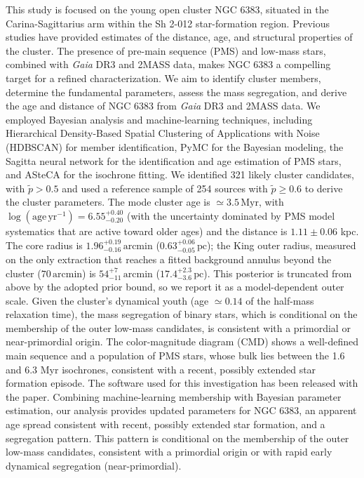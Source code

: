 \documentclass{aa}
\begin{document}
  \abstract
   {This study is focused on the young open cluster NGC 6383, situated in the Carina-Sagittarius arm within the Sh 2-012 star-formation region. Previous studies have provided estimates of the distance, age, and structural properties of the cluster. The presence of pre-main sequence (PMS) and low-mass stars, combined with \textit{Gaia} DR3 and 2MASS data, makes NGC 6383 a compelling target for a refined characterization.}
   {We aim to identify cluster members, determine the fundamental parameters, assess the mass segregation, and derive the age and distance of NGC 6383 from \textit{Gaia} DR3 and 2MASS data.}
   {We employed Bayesian analysis and machine-learning techniques, including Hierarchical Density-Based Spatial Clustering of Applications with Noise (HDBSCAN) for member identification, PyMC for the Bayesian modeling, the Sagitta neural network for the identification and age estimation of PMS stars, and ASteCA for the isochrone fitting.}   
   {We identified 321 likely cluster candidates, with $\tilde{p}>0.5$ and used a reference sample of 254 sources with $\tilde{p}\geq0.6$ to derive the cluster parameters. The mode cluster age is $\simeq3.5\,\mathrm{Myr}$, with $\log(\mathrm{age}\,\mathrm{yr^{-1}}) = 6.55^{+0.40}_{-0.20}$ (with the uncertainty dominated by PMS model systematics that are active toward older ages) and the distance is $1.11\pm 0.06$ kpc. The core radius is $1.96^{+0.19}_{-0.16}\,\mathrm{arcmin}$ ($0.63^{+0.06}_{-0.05}\,\mathrm{pc}$); the King outer radius, measured on the only extraction that reaches a fitted background annulus beyond the cluster ($70\,\mathrm{arcmin}$) is $54^{+7}_{-11}\,\mathrm{arcmin}$ ($17.4^{+2.3}_{-3.6}\,\mathrm{pc}$). This posterior is truncated from above by the adopted prior bound, so we report it as a model-dependent outer scale. Given the cluster's dynamical youth (age $\simeq0.14$ of the half-mass relaxation time), the mass segregation of binary stars, which is conditional on the membership of the outer low-mass candidates, is consistent with a primordial or near-primordial origin. The color-magnitude diagram (CMD) shows a well-defined main sequence and a population of PMS stars, whose bulk lies between the 1.6 and 6.3 Myr isochrones, consistent with a recent, possibly extended star formation episode. The software used for this investigation has been released with the paper.}
   {Combining machine-learning membership with Bayesian parameter estimation, our analysis provides updated parameters for NGC 6383, an apparent age spread consistent with recent, possibly extended star formation, and a segregation pattern. This pattern is conditional on the membership of the outer low-mass candidates, consistent with a primordial origin or with rapid early dynamical segregation (near-primordial).}
\end{document}
